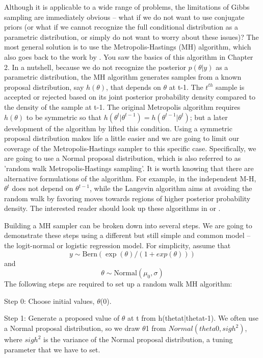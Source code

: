 Although it is applicable to a wide range of problems, the limitations
of Gibbs sampling are immediately obvious – what if we do not want to
use conjugate priors (or what if we cannot recognize the full
conditional distribution as a parametric distribution, or simply do
not want to worry about these issues)? The most general solution is to
use the Metropolis-Hastings (MH) algorithm, which also goes back to
the work by \citet{metropolis_ulam:1953}. You saw the basics of this
algorithm in Chapter 2. In a nutshell, because we do not recognize the
posterior $p(\theta|y)$ as a parametric distribution, the MH algorithm
generates samples from a known proposal distribution, say $h(\theta)$,
that depends on $\theta$ at t-1. The $t^{th}$ sample is accepted or
rejected based on its joint posterior probability density compared to
the density of the sample at t-1. The original Metropolis algorithm
requires $h(\theta)$ to be symmetric so that
$h(\theta^{t}|\theta^{t-1}) = h(\theta^{t-1}|\theta^{t})$; but a later
development of the algorithm by \citet{hastings:1970} lifted this
condition. Using a symmetric proposal distribution makes life a little
easier and we are going to limit our coverage of the
Metropolis-Hastings sampler to this specific case. Specifically, we
are going to use a Normal proposal distribution, which is also
referred to as 'random walk Metropolis-Hastings sampling'. It is worth
knowing that there are alternative formulations of the algorithm. For
example, in the independent M-H, $\theta^{t}$ does not depend on
$\theta^{t-1}$, while the Langevin algorithm \citep{roberts_etal:1998}
aims at avoiding the random walk by favoring moves towards regions of
higher posterior probability density. The interested reader should
look up these algorithms in \citet{robert_casella:2004} or
\citet{robert_casella:2010}.

Building a MH sampler can be broken down into several steps. We are going to demonstrate these steps using a different but still simple and common model – the logit-normal or logistic regression model. For simplicity, assume that
\[
y \sim \mbox{Bern}(\exp(\theta)/(1+ exp(\theta)))
\]
and
\[
\theta \sim \mbox{Normal}(\mu_0, \sigma)
\]
The following steps are required to set up a random walk MH algorithm:

{\flushleft Step 0: Choose initial values, $\theta$(0).}

{\flushleft Step 1: Generate a proposed value of $\theta$ at t from h(thetat|thetat-1). }
We often use a Normal proposal distribution, so we draw $\theta$1 from $Normal(theta0, sigh^2)$, where $sigh^2$ is the variance of the Normal proposal distribution, a tuning parameter  that we have to set.

